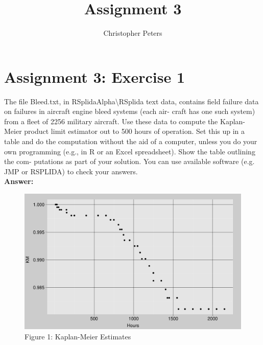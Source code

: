 \documentclass{article}
\begin{document}
\title{Assignment 3}
\author{Christopher Peters}
\maketitle

\section{Assignment 3: Exercise 1}

The file Bleed.txt, in RSplidaAlpha\textbackslash RSplida text data, contains
field failure data on failures in aircraft engine bleed systems (each air-
craft has one such system) from a fleet of 2256 military aircraft. Use
these data to compute the Kaplan-Meier product limit estimator out to
500 hours of operation. Set this up in a table and do the computation
without the aid of a computer, unless you do your own programming
(e.g., in R or an Excel spreadsheet). Show the table outlining the com-
putations as part of your solution. You can use available software (e.g.
JMP or RSPLIDA) to check your answers.\\


{\bf Answer:}





\begin{figure}[htbp]
\begin{center}
\includegraphics{assignment3_sweave_2-004}
\caption{Figure 1: Kaplan-Meier Estimates}
\end{center}  
\end{figure}
\end{document}

